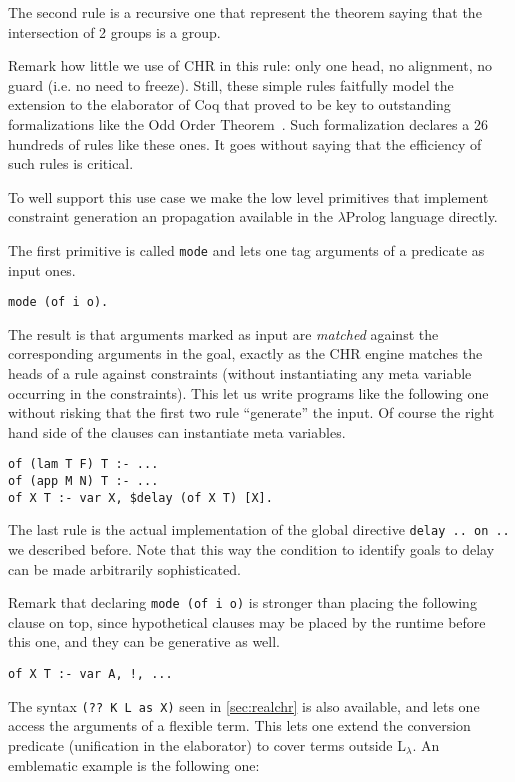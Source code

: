 \documentclass{easychair}
\begin{document}
The second rule is a recursive one that represent the theorem saying
that the intersection of 2 groups is a group.

Remark how little we use of CHR in this rule: only one head, no alignment,
no guard (i.e. no need to freeze).
Still, these simple rules faitfully model the extension to the elaborator
of Coq that proved to be key to outstanding formalizations like
the Odd Order Theorem~\cite{oothm}.  Such formalization declares a 26
hundreds of rules like these ones.  It goes without saying that
the efficiency of such rules is critical.

To well support this use case we make the low level primitives that implement
constraint generation an propagation available in the $\lambda$Prolog
language directly.

The first primitive is called \verb+mode+ and lets one tag arguments of
a predicate as input ones.

\begin{Verbatim}
mode (of i o).
\end{Verbatim}

The result is that arguments marked as input are \emph{matched}
against the corresponding arguments in the goal, exactly as the
CHR engine matches the heads of a rule against constraints (without
instantiating any meta variable occurring in the constraints).
This let us write programs like the following one without risking that
the first two rule ``generate'' the input.  Of course the right
hand side of the clauses can instantiate meta variables.

\begin{Verbatim}
of (lam T F) T :- ...
of (app M N) T :- ...
of X T :- var X, $delay (of X T) [X].
\end{Verbatim}

The last rule is the actual implementation of the global directive
\verb+delay .. on ..+ we described before.  Note that this way the
condition to identify goals to delay can be made arbitrarily
sophisticated.

Remark that declaring \verb+mode (of i o)+ is stronger than
placing the following clause on top, 
since hypothetical clauses may be placed by the runtime before this one,
and they can be generative as well.

\begin{Verbatim}
of X T :- var A, !, ...
\end{Verbatim}

The syntax \verb+(?? K L as X)+ seen in \ref{sec:realchr} is also
available, and lets one access the arguments of a flexible term.
This lets one extend the conversion predicate (unification in the
elaborator) to cover terms outside L$_\lambda$.  An emblematic example is
the following one:
\end{document}
